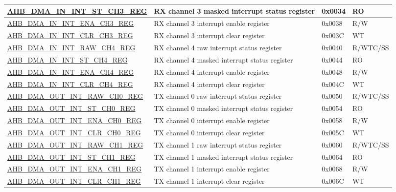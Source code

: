 \begin{longtable}{ | l | p{10cm} | p{1.3cm} | l | }
\hyperref[regdesc:AHBDMAININTSTCHNREG]{AHB\_DMA\_IN\_INT\_ST\_CH3\_REG} & RX channel 3 masked interrupt status register & 0x0034 & RO \\ \hline
\hyperref[regdesc:AHBDMAININTENACHNREG]{AHB\_DMA\_IN\_INT\_ENA\_CH3\_REG} & RX channel 3 interrupt enable register & 0x0038 & R/W \\ \hline
\hyperref[regdesc:AHBDMAININTCLRCHNREG]{AHB\_DMA\_IN\_INT\_CLR\_CH3\_REG} & RX channel 3 interrupt clear register & 0x003C & WT \\ \hline
\hyperref[regdesc:AHBDMAININTRAWCHNREG]{AHB\_DMA\_IN\_INT\_RAW\_CH4\_REG} & RX channel 4 raw interrupt status register & 0x0040 & R/WTC/SS \\ \hline
\hyperref[regdesc:AHBDMAININTSTCHNREG]{AHB\_DMA\_IN\_INT\_ST\_CH4\_REG} & RX channel 4 masked interrupt status register & 0x0044 & RO \\ \hline
\hyperref[regdesc:AHBDMAININTENACHNREG]{AHB\_DMA\_IN\_INT\_ENA\_CH4\_REG} & RX channel 4 interrupt enable register & 0x0048 & R/W \\ \hline
\hyperref[regdesc:AHBDMAININTCLRCHNREG]{AHB\_DMA\_IN\_INT\_CLR\_CH4\_REG} & RX channel 4 interrupt clear register & 0x004C & WT \\ \hline
\hyperref[regdesc:AHBDMAOUTINTRAWCHNREG]{AHB\_DMA\_OUT\_INT\_RAW\_CH0\_REG} & TX channel 0 raw interrupt status register & 0x0050 & R/WTC/SS \\ \hline
\hyperref[regdesc:AHBDMAOUTINTSTCHNREG]{AHB\_DMA\_OUT\_INT\_ST\_CH0\_REG} & TX channel 0 masked interrupt status register & 0x0054 & RO \\ \hline
\hyperref[regdesc:AHBDMAOUTINTENACHNREG]{AHB\_DMA\_OUT\_INT\_ENA\_CH0\_REG} & TX channel 0 interrupt enable register & 0x0058 & R/W \\ \hline
\hyperref[regdesc:AHBDMAOUTINTCLRCHNREG]{AHB\_DMA\_OUT\_INT\_CLR\_CH0\_REG} & TX channel 0 interrupt clear register & 0x005C & WT \\ \hline
\hyperref[regdesc:AHBDMAOUTINTRAWCHNREG]{AHB\_DMA\_OUT\_INT\_RAW\_CH1\_REG} & TX channel 1 raw interrupt status register & 0x0060 & R/WTC/SS \\ \hline
\hyperref[regdesc:AHBDMAOUTINTSTCHNREG]{AHB\_DMA\_OUT\_INT\_ST\_CH1\_REG} & TX channel 1 masked interrupt status register & 0x0064 & RO \\ \hline
\hyperref[regdesc:AHBDMAOUTINTENACHNREG]{AHB\_DMA\_OUT\_INT\_ENA\_CH1\_REG} & TX channel 1 interrupt enable register & 0x0068 & R/W \\ \hline
\hyperref[regdesc:AHBDMAOUTINTCLRCHNREG]{AHB\_DMA\_OUT\_INT\_CLR\_CH1\_REG} & TX channel 1 interrupt clear register & 0x006C & WT \\ \hline

\end{longtable}
